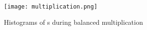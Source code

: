 \begin{figure}[hp]
  \centering
  \texttt{[image: multiplication.png]}
  \caption{Histograms of \hammingw{}s during balanced multiplication}
  \label{fig:mult}
\end{figure}




